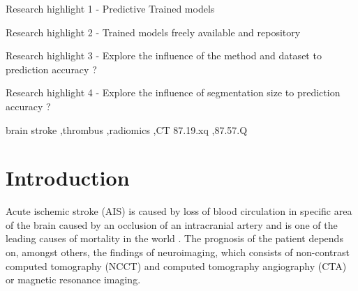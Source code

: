 \documentclass[preprint,12pt]{elsarticle}
\begin{document}
\begin{frontmatter}
\begin{abstract}
Abstract text.
\end{abstract}

\begin{graphicalabstract}
\end{graphicalabstract}

\begin{highlights} %
\item Research highlight 1 - Predictive Trained models
\item Research highlight 2 - Trained models freely available and repository
\item Research highlight 3 - Explore the influence of the method and dataset to prediction accuracy ?
\item Research highlight 4 - Explore the influence of segmentation size to prediction accuracy ?
\end{highlights}

\begin{keyword}
brain stroke \sep thrombus \sep radiomics \sep CT
87.19.xq \sep 87.57.Q

\end{keyword}

\end{frontmatter}



\section{Introduction}
\label{sec1}

Acute ischemic stroke (AIS) is caused by loss of blood circulation in specific area of the brain caused by an occlusion of an intracranial artery and is one of the leading causes of mortality in the world \cite{Phipps2020}. The prognosis of the patient depends on, amongst others, the findings of neuroimaging, which consists of non-contrast computed tomography (NCCT) and computed tomography angiography (CTA) or magnetic resonance imaging.
\end{document}

